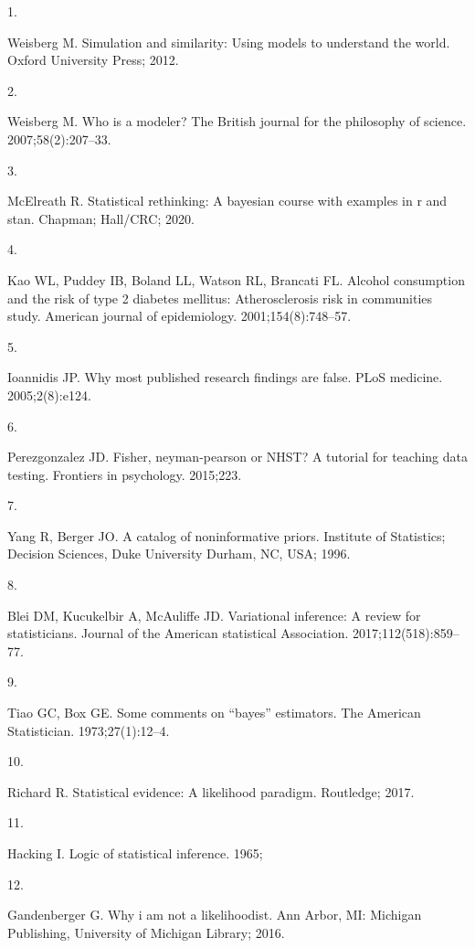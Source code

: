 \documentclass[
  10pt,
]{scrbook}
\newlength{\cslhangindent}
\newlength{\csllabelwidth}
\newlength{\cslentryspacingunit} %
\newenvironment{CSLReferences}[2] %
 {%
  \setlength{\parindent}{0pt}
  \ifodd #1
  \let\oldpar\par
  \def\par{\hangindent=\cslhangindent\oldpar}
  \fi
  \setlength{\parskip}{#2\cslentryspacingunit}
 }%
 {}
\newcommand{\CSLLeftMargin}[1]{\parbox[t]{\csllabelwidth}{#1}}
\newcommand{\CSLRightInline}[1]{\parbox[t]{\linewidth - \csllabelwidth}{#1}\break}
\begin{document}
\hypertarget{refs}{}
\begin{CSLReferences}{0}{0}
\leavevmode{}%
\CSLLeftMargin{1. }
\CSLRightInline{Weisberg M. Simulation and similarity: Using models to understand the world. Oxford University Press; 2012. }

\leavevmode{}%
\CSLLeftMargin{2. }
\CSLRightInline{Weisberg M. Who is a modeler? The British journal for the philosophy of science. 2007;58(2):207--33. }

\leavevmode{}%
\CSLLeftMargin{3. }
\CSLRightInline{McElreath R. Statistical rethinking: A bayesian course with examples in r and stan. Chapman; Hall/CRC; 2020. }

\leavevmode{}%
\CSLLeftMargin{4. }
\CSLRightInline{Kao WL, Puddey IB, Boland LL, Watson RL, Brancati FL. Alcohol consumption and the risk of type 2 diabetes mellitus: Atherosclerosis risk in communities study. American journal of epidemiology. 2001;154(8):748--57. }

\leavevmode{}%
\CSLLeftMargin{5. }
\CSLRightInline{Ioannidis JP. Why most published research findings are false. PLoS medicine. 2005;2(8):e124. }

\leavevmode{}%
\CSLLeftMargin{6. }
\CSLRightInline{Perezgonzalez JD. Fisher, neyman-pearson or NHST? A tutorial for teaching data testing. Frontiers in psychology. 2015;223. }

\leavevmode{}%
\CSLLeftMargin{7. }
\CSLRightInline{Yang R, Berger JO. A catalog of noninformative priors. Institute of Statistics; Decision Sciences, Duke University Durham, NC, USA; 1996. }

\leavevmode{}%
\CSLLeftMargin{8. }
\CSLRightInline{Blei DM, Kucukelbir A, McAuliffe JD. Variational inference: A review for statisticians. Journal of the American statistical Association. 2017;112(518):859--77. }

\leavevmode{}%
\CSLLeftMargin{9. }
\CSLRightInline{Tiao GC, Box GE. Some comments on {``bayes''} estimators. The American Statistician. 1973;27(1):12--4. }

\leavevmode{}%
\CSLLeftMargin{10. }
\CSLRightInline{Richard R. Statistical evidence: A likelihood paradigm. Routledge; 2017. }

\leavevmode{}%
\CSLLeftMargin{11. }
\CSLRightInline{Hacking I. Logic of statistical inference. 1965; }

\leavevmode{}%
\CSLLeftMargin{12. }
\CSLRightInline{Gandenberger G. Why i am not a likelihoodist. Ann Arbor, MI: Michigan Publishing, University of Michigan Library; 2016. }

\end{CSLReferences}

\printindex
\thispagestyle{empty}
\end{document}
